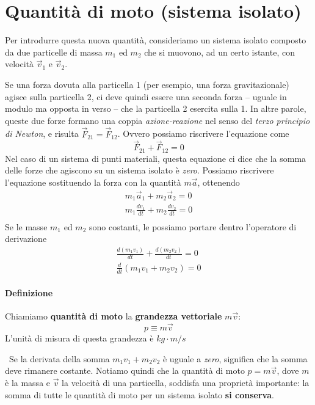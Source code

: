 \documentclass[a4paper,11pt,oneside]{book}
\begin{document}
\section{Quantità di moto (sistema isolato)}
Per introdurre questa nuova quantità, consideriamo un sistema isolato composto da due particelle di massa $m_1$ ed $m_2$ che si muovono, ad un certo istante, con velocità $\vec{v}_1$ e $\vec{v}_2$.

Se una forza dovuta alla particella 1 (per esempio, una forza gravitazionale) agisce sulla particella 2, ci deve quindi essere una seconda forza – uguale in modulo ma opposta in verso – che la particella 2 esercita sulla 1.
In altre parole, queste due forze formano una coppia \emph{azione-reazione} nel senso del \emph{terzo principio di Newton}, e risulta $\vec{F}_{21} = \vec{F}_{12}$. Ovvero possiamo riscrivere l'equazione come
\begin{equation*}
    \vec{F}_{21} + \vec{F}_{12} = 0
\end{equation*}
Nel caso di un sistema di punti materiali, questa equazione ci dice che la somma delle forze che agiscono su un sistema isolato è \emph{zero}. Possiamo riscrivere l'equazione sostituendo
la forza con la quantità $m\vec{a}$, ottenendo
\begin{gather*}
    m_1\vec{a}_1 + m_2\vec{a}_2 = 0 \\ 
    m_1 \frac{dv_1}{dt} + m_2 \frac{dv_2}{dt} = 0 \\
\end{gather*}
Se le masse $m_1$ ed $m_2$ sono costanti, le possiamo portare dentro l’operatore di derivazione
\begin{gather*}
    \frac{d(m_1v_1)}{dt} + \frac{d(m_2v_2)}{dt} = 0 \\ 
    \tfrac{d}{dt}(m_1v_1 + m_2v_2) = 0
\end{gather*}

\paragraph{Definizione} Chiamiamo \textbf{quantità di moto} la \textbf{grandezza vettoriale} $m\vec{v}$:
\begin{equation*}
    p \equiv m\vec{v}
\end{equation*}
L'unità di misura di questa grandezza è $kg \cdot m/s$

~\newline Se la derivata della somma $m_1v_1 + m_2v_2$ è uguale a \emph{zero}, significa che la somma deve rimanere costante.
Notiamo quindi che la quantità di moto $p = m\vec{v}$, dove $m$ è la massa e $\vec{v}$ la velocità di una particella, soddisfa una proprietà importante: la somma di tutte le quantità di moto per un sistema isolato \textbf{si conserva}.
\end{document}
